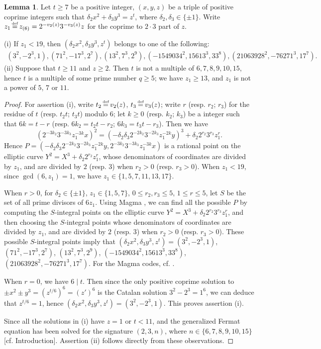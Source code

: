 \documentclass[a4paper, 12pt]{article}
\DeclareMathOperator{\defeq}{\overset{\text{\tiny{def}}}{=}}
\numberwithin{equation}{section}
\theoremstyle{definition}
\newtheorem{lem}[thm]{Lemma}
\begin{document}
\begin{lem}  \label{3-1-lem-1}
Let $t\ge 7$ be a positive integer, $(x,y,z)$ be a triple of positive coprime integers such that $\delta_2 x^2 + \delta_3 y^3 = z^t$, where $\delta_2,\delta_3 \in \{\pm 1\}$.
Write $z_1 \defeq z_{(6)} = 2^{-v_2(z)} 3^{-v_3(z)} z$ for the coprime to $2\cdot 3$ part of $z$.
 
(i) If $z_1 < 19$, then $(\delta_2x^2, \delta_3y^3, z^t)$ belongs to one of the following:
\begin{gather*}
(3^2, -2^3, 1), (71^2, -17^3, 2^7), (13^2, 7^3, 2^9), (-1549034^2, 15613^3, 33^8), (21063928^2, -76271^3, 17^7).
\end{gather*}
(ii) Suppose that $t\ge 11$ and $z \ge 2$. 
Then $t$ is not a multiple of $6,7, 8, 9, 10, 15$, hence $t$ is a multiple of some prime number $q \ge 5$; we have $z _1 \ge 13$, and $z_1$ is not a power of $5$, $7$ or $11$.
\end{lem}
\begin{proof}
For assertion (i), write $t_2 \defeq v_2(z)$, $t_3 \defeq v_3(z)$; write $r$ (resp. $r_2$; $r_3$) for the residue of $t$ (resp. $t_2 t$; $t_3 t$) modulo $6$; let $k \ge 0$ (resp. $k_2$; $k_3$) be a integer such that $6k = t - r$ (resp. $6 k_2 = t_2 t - r_2$;  $6 k_3 = t_3 t - r_3$). 
Then we have 
$$(2^{-3 k_2} 3^{-3 k_3} z_1^{-3 k} x)^2 = (-\delta_2\delta_3 2^{-2 k_2} 3^{-2 k_3} z_1^{-2 k} y)^3 + \delta_2 2^{r_2} 3^{r_3} z_1^r .$$
Hence $P = (-\delta_2\delta_3 2^{-2 k_2} 3^{-2 k_3} z_1^{-2 k} y, 2^{-3 k_2} 3^{-3 k_3} z_1^{-3 k} x)$ is a rational point on the elliptic curve $Y^2 = X^3 + \delta_2 2^{r_2} z_1^r$, whose denominators of coordinates are divided by $z_1$, and are divided by $2$ (resp. $3$) when $r_2 > 0$ (resp. $r_3 > 0$).
When $z_1 < 19$, since $\gcd(6, z_1) = 1$, we have $z_1 \in \{1,5,7,11,13,17\}$.

When $r > 0$, for $\delta_2 \in \{\pm 1\}$, $z_1 \in \{1,5,7\}$, $0\le r_2, r_3 \le 5$, $1\le r\le 5$, let $S$ be the set of all prime divisors of $6z_1$. 
Using Magma \cite{Magma}, we can find all the possible $P$ by computing the $S$-integral points on the elliptic curve $Y^2 = X^3 + \delta_2 2^{r_2} 3^{r_3} z_1^r$,
and then choosing the $S$-integral points whose denominators of coordinates are divided by $z_1$, and are divided by $2$ (resp. $3$) when $r_2 > 0$ (resp. $r_3 > 0$).
These possible $S$-integral points imply that $(\delta_2x^2, \delta_3y^3, z^t) = (3^2, -2^3, 1)$, $(71^2, -17^3, 2^7)$, $(13^2, 7^3, 2^9)$, $(-1549034^2, 15613^3, 33^8)$, $(21063928^2, -76271^3, 17^7)$. 
For the Magma codes, cf. \cite{code_of_zpzhou}.

When $r = 0$, we have $6\mid t$. Then since the only positive coprime solution to $\pm x^2 \pm y^3 = (z^{t/6})^6 = (z')^6$ is the Catalan solution $3^2-2^3=1^6$, we can deduce that $z^{t/6} = 1$, hence $(\delta_2x^2, \delta_3y^3, z^t) = (3^2, -2^3, 1)$.
This proves assertion (i).

Since all the solutions in (i) have $z=1$ or $t < 11$, and the generalized Fermat equation has been solved for the signature $(2,3,n)$, where $n\in \{6,7,8,9,10,15\}$ [cf. Introduction]. Assertion (ii) follows directly from these observations.
\end{proof}
\end{document}
